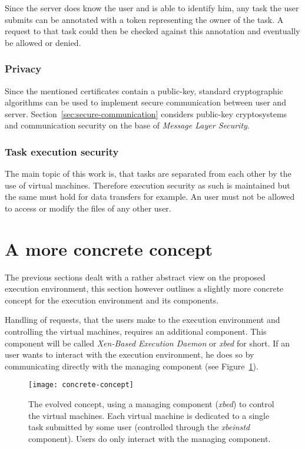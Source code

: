 Since the server does know the user  and is able to identify him, any task
the user submits  can be annotated with a token  representing the owner of
the  task.  A  request to  that task  could then  be checked  against this
annotation and eventually be allowed or denied.

\subsubsection{Privacy}

Since   the  mentioned   certificates  contain   a   public-key,  standard
cryptographic  algorithms can  be used  to implement  secure communication
between user and server.  Section~\ref{sec:secure-communication} considers
public-key  cryptosystems  and  communication  security  on  the  base  of
\emph{Message Layer Security}.

\subsubsection{Task execution security}

The main topic  of this work is, that tasks are  separated from each other
by the use  of virtual machines.  Therefore execution  security as such is
maintained but the same must hold  for data transfers for example. An user
must not be allowed to access or modify the files of any other user.

\section{A more concrete concept}

The previous  sections dealt with a  rather abstract view  on the proposed
execution  environment,  this section  however  outlines  a slightly  more
concrete  concept  for  the  execution  environment  and  its  components.

Handling of requests, that the users make to the execution environment and
controlling the  virtual machines, requires an  additional component. This
component will be called  \emph{Xen-Based Execution Daemon} or \emph{xbed}
for short. If an user wants to interact with the execution environment, he
does  so  by  communicating  directly  with the  managing  component  (see
Figure~\ref{fig:concrete-concept}).

\begin{figure}[htbp]
  \centering
  \texttt{[image: concrete-concept]}
  \caption[A more concrete concept]{The  evolved concept, using a managing
    component (\emph{xbed}) to control the virtual machines.  Each virtual
    machine  is  dedicated  to  a  single  task  submitted  by  some  user
    (controlled  through the  \emph{xbeinstd} component).   Users  do only
    interact with the managing component.}
  \label{fig:concrete-concept}
\end{figure}

